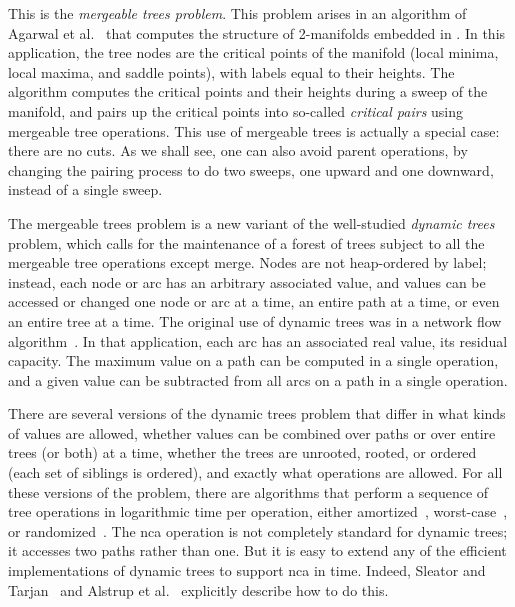 \documentclass[twoside,leqno,twocolumn]{article}
\begin{document}
This is the \emph{mergeable trees problem}.  This problem arises in an algorithm of Agarwal et al.~\cite{AEHW04,AEHW06} that computes the structure of 2-manifolds embedded in .  In this application, the tree nodes are the critical points of the manifold (local minima, local maxima, and saddle points), with labels equal to their heights.  The algorithm computes the critical points and their heights during a sweep of the manifold, and pairs up the critical points into so-called \emph{critical pairs} using mergeable tree operations.  This use of mergeable trees is actually a special case: there are no cuts.  As we shall see, one can also avoid parent operations, by changing the pairing process to do two sweeps, one upward and one downward, instead of a single sweep.

The mergeable trees problem is a new variant of the well-studied \emph{dynamic trees} problem, which calls for the maintenance of a forest of trees subject to all the mergeable tree operations except merge.  Nodes are not heap-ordered by label; instead, each node or arc has an arbitrary associated value, and values can be accessed or changed one node or arc at a time, an entire path at a time, or even an entire tree at a time.  The original use of dynamic trees was in a network flow algorithm~\cite{ST83}.  In that application, each arc has an associated real value, its residual capacity.  The maximum value on a path can be computed in a single operation, and a given value can be subtracted from all arcs on a path in a single operation.

There are several versions of the dynamic trees problem that differ in what kinds of values are allowed, whether values can be combined over paths or over entire trees (or both) at a time, whether the trees are unrooted, rooted, or ordered (each set of siblings is ordered), and exactly what operations are allowed.  For all these versions of the problem, there are algorithms that perform a sequence of tree operations in logarithmic time per operation,  either amortized~\cite{ST85,TW05}, worst-case~\cite{AHTdL05,Fre85,ST83}, or randomized~\cite{ABHVW04}. The nca operation is not completely standard for dynamic trees; it accesses two paths rather than one.  But it is easy to extend any of the efficient implementations of dynamic trees to support nca in  time.  Indeed, Sleator and Tarjan~\cite{ST83} and Alstrup et al.~\cite{AHTdL05} explicitly describe how to do this.
\end{document}
